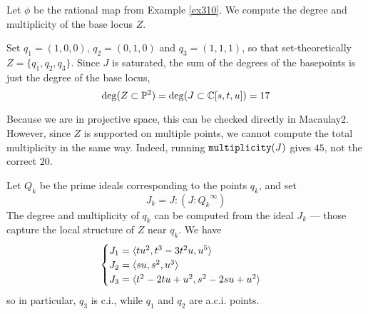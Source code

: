 \documentclass[fleqn,reqno]{amsart}
\begin{document}
\begin{example}[$\mt{ex311}$]
\label{ex311}
Let $\phi$ be the rational map from Example \ref{ex310}.
We compute the degree and multiplicity of the base locus $Z$.

Set $q_1=(1,0,0)$, $q_2=(0,1,0)$ and $q_3=(1,1,1)$, so that set-theoretically $Z=\{q_1,q_2,q_3\}$.
Since $J$ is saturated,
the sum of the degrees of the basepoints is just the degree of the base locus,
\[
	\deg(Z\subset\mathbb{P}^2)=\deg(J\subset\mathbb{C}[s,t,u])=17
\]

Because we are in projective space, this can be checked directly in Macaulay2.
However, since $Z$ is supported on multiple points,
we cannot compute the total multiplicity in the same way.
Indeed, running $\mathop{\tt multiplicity}(J)$ gives $45$, not the correct $20$.

Let $Q_k$ be the prime ideals corresponding to the points $q_k$, and set
\[
	J_k=J:(J:{Q_k}^\infty)
\]
The degree and multiplicity of $q_k$ can be computed from the ideal $J_k$ ---
those capture the local structure of $Z$ near $q_k$.
We have
\[
	\begin{cases}
	J_1=\langle t u^{2},t^{3}-3 t^{2} u,u^{5}\rangle\\
	J_2=\langle s u,s^{2},u^{3}\rangle\\
	J_3=\langle t^{2}-2 t u+u^{2},s^{2}-2 s u+u^{2}\rangle
	\end{cases}
\]
so in particular, $q_3$ is c.i., while $q_1$ and $q_2$ are a.c.i. points.
\end{example}
\end{document}
